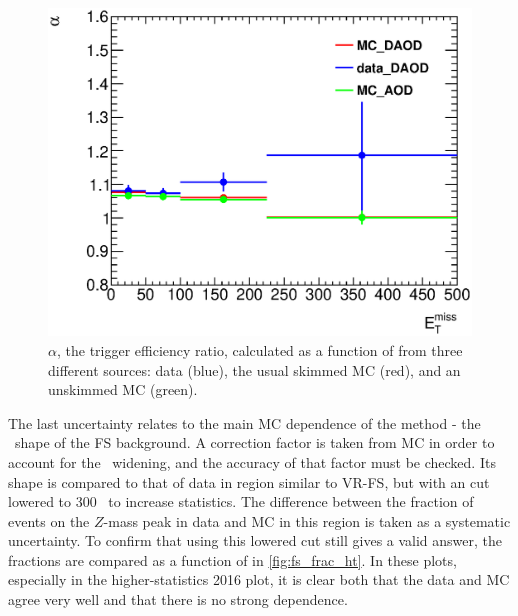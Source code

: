 \begin{centering}
\begin{figure}[!hbt]
\myfloatalign
\includegraphics[width=.85\linewidth]{figures/fs/trigger_ratios.eps}
\caption{$\alpha$, the trigger efficiency ratio, calculated as a function of \met from three different sources: data (blue), the usual skimmed \ttbar \ac{MC} (red), and an unskimmed \ttbar \ac{MC} (green).}
\label{fig:fs_alpha}
\end{figure}
\end{centering}

The last uncertainty relates to the main \ac{MC} dependence of the method - the \mll~shape of the \ac{FS} background. A correction factor is taken from \ac{MC} in order to account for the \mll~widening, and the accuracy of that factor must be checked. Its shape is compared to that of data in region similar to VR-FS, but with an \HT cut lowered to 300 \gev~to increase statistics. The difference between the fraction of events on the $Z$-mass peak in data and \ac{MC} in this region is taken as a systematic uncertainty. To confirm that using this lowered \HT cut still gives a valid answer, the fractions are compared as a function of \HT in \autoref{fig:fs_frac_ht}. In these plots, especially in the higher-statistics 2016 plot, it is clear both that the data and \ac{MC} agree very well and that there is no strong \HT dependence. 

